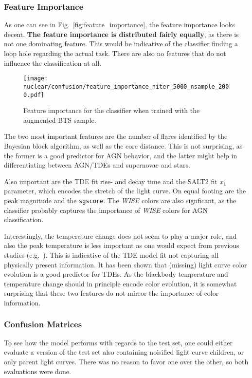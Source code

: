 \subsubsection{Feature Importance}
As one can see in Fig.~\ref{fig:feature_importance}, the feature importance looks decent. \textbf{The feature importance is distributed fairly equally}, as there is not one dominating feature. This would be indicative of the classifier finding a loop hole regarding the actual task. There are also no features that do not influence the classification at all.

\begin{figure}[htpb]
  \texttt{[image: nuclear/confusion/feature\_importance\_niter\_5000\_nsample\_2000.pdf]}
  \caption[Feature importance]{Feature importance for the classifier when trained with the augmented BTS sample.}
\end{figure}

The two most important features are the number of flares identified by the Bayesian block algorithm, as well as the core distance. This is not surprising, as the former is a good predictor for AGN behavior, and the latter might help in differentiating between AGN/TDEs and supernovae and stars.

Also important are the TDE fit rise- and decay time and the SALT2 fit $x_1$ parameter, which encodes the stretch of the light curve. On equal footing are the peak magnitude and the \texttt{sgscore}. The \textit{WISE} colors are also signficant, as the classifier probably captures the importance of \textit{WISE} colors for AGN classification.

Interestingly, the temperature change does not seem to play a major role, and also the peak temperature is less important as one would expect from previous studies (e.g.~\cite{Velzen2021a}). This is indicative of the TDE model fit not capturing all physically present information. It has been shown that (missing) light curve color evolution is a good predictor for TDEs. As the blackbody temperature and temperature change should in principle encode color evolution, it is somewhat surprising that these two features do not mirror the importance of color information.

\subsubsection{Confusion Matrices}\label{confusion_matrices}
To see how the model performs with regards to the test set, one could either evaluate a version of the test set also containing noisified light curve children, or only parent light curves. There was no reason to favor one over the other, so both evaluations were done.

